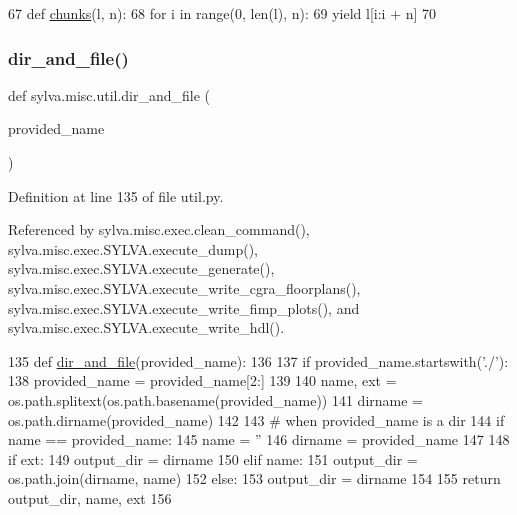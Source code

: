 \begin{DoxyCode}
67 \textcolor{keyword}{def }\hyperlink{namespacesylva_1_1misc_1_1util_aa202ba520fb5e2daa064c4379aeeb5cf}{chunks}(l, n):
68     \textcolor{keywordflow}{for} i \textcolor{keywordflow}{in} range(0, len(l), n):
69         \textcolor{keywordflow}{yield} l[i:i + n]
70 
\end{DoxyCode}
\mbox{\label{namespacesylva_1_1misc_1_1util_a0ce6d1d719234031353b60ac60f2af0d}} 
\subsubsection{\texorpdfstring{dir\+\_\+and\+\_\+file()}{dir\_and\_file()}}
{\footnotesize\ttfamily def sylva.\+misc.\+util.\+dir\+\_\+and\+\_\+file (\begin{DoxyParamCaption}\item[{}]{provided\+\_\+name }\end{DoxyParamCaption})}



Definition at line 135 of file util.\+py.



Referenced by sylva.\+misc.\+exec.\+clean\+\_\+command(), sylva.\+misc.\+exec.\+S\+Y\+L\+V\+A.\+execute\+\_\+dump(), sylva.\+misc.\+exec.\+S\+Y\+L\+V\+A.\+execute\+\_\+generate(), sylva.\+misc.\+exec.\+S\+Y\+L\+V\+A.\+execute\+\_\+write\+\_\+cgra\+\_\+floorplans(), sylva.\+misc.\+exec.\+S\+Y\+L\+V\+A.\+execute\+\_\+write\+\_\+fimp\+\_\+plots(), and sylva.\+misc.\+exec.\+S\+Y\+L\+V\+A.\+execute\+\_\+write\+\_\+hdl().


\begin{DoxyCode}
135 \textcolor{keyword}{def }\hyperlink{namespacesylva_1_1misc_1_1util_a0ce6d1d719234031353b60ac60f2af0d}{dir\_and\_file}(provided\_name):
136 
137     \textcolor{keywordflow}{if} provided\_name.startswith(\textcolor{stringliteral}{'./'}):
138         provided\_name = provided\_name[2:]
139 
140     name, ext = os.path.splitext(os.path.basename(provided\_name))
141     dirname = os.path.dirname(provided\_name)
142 
143     \textcolor{comment}{# when provided\_name is a dir}
144     \textcolor{keywordflow}{if} name == provided\_name:
145         name = \textcolor{stringliteral}{''}
146         dirname = provided\_name
147 
148     \textcolor{keywordflow}{if} ext:
149         output\_dir = dirname
150     \textcolor{keywordflow}{elif} name:
151         output\_dir = os.path.join(dirname, name)
152     \textcolor{keywordflow}{else}:
153         output\_dir = dirname
154 
155     \textcolor{keywordflow}{return} output\_dir, name, ext
156 
\end{DoxyCode}
\mbox{\label{namespacesylva_1_1misc_1_1util_a0881116abd7a50c6cd552b6b3edafea3}} 
